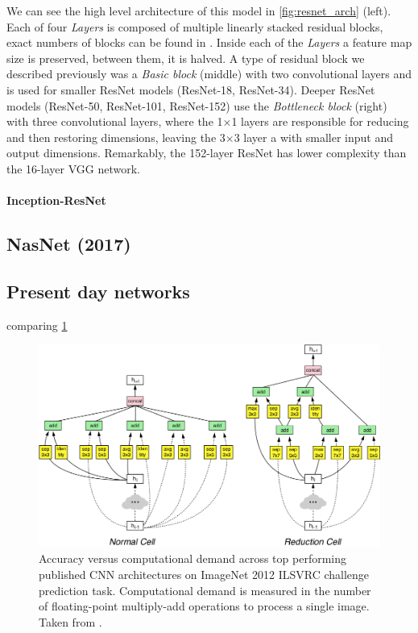 We can see the high level architecture of this model in \cref{fig:resnet_arch} (left). Each of four \textit{Layers} is composed of multiple linearly stacked residual blocks, exact numbers of blocks can be found in \cite[table 1]{bib:resnet}. Inside each of the \textit{Layers} a feature map size is preserved, between them, it is halved. A type of residual block we described previously was a \textit{Basic block} (middle) with two convolutional layers and is used for smaller ResNet models (ResNet-18, ResNet-34). Deeper ResNet models (ResNet-50, ResNet-101, ResNet-152) use the \textit{Bottleneck block} (right) with three convolutional layers, where the 1$\times$1 layers are responsible for reducing and then restoring dimensions, leaving the 3$\times$3 layer a with smaller input and output dimensions. Remarkably, the 152-layer ResNet has lower complexity than the 16-layer VGG network.



\paragraph{Inception-ResNet}



\subsection*{NasNet (2017)}
\label{sec:nasnet}

\subsection*{Present day networks}
 comparing \cref{fig:cnncomp}

\begin{figure}
    \includegraphics[width=\textwidth]{img/nasnet}
    \caption{Accuracy versus computational demand across top performing published CNN architectures on ImageNet 2012 ILSVRC challenge prediction task. Computational demand is measured in the number of floating-point multiply-add operations to process a single image. Taken from \cite{bib:nasnet}.}
    \label{fig:cnncomp}
\end{figure}

